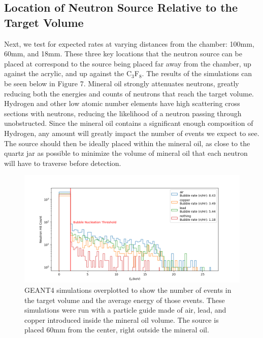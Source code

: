 \documentclass[%
12pt,
twoside,
reprint,
amsmath,amssymb,
aps,
]{article}
\begin{document}
	\subsection{Location of Neutron Source Relative to the Target Volume}
	\par Next, we test for expected rates at varying distances from the chamber: 100mm, 60mm, and 18mm. These three key locations that the neutron source can be placed at correspond to the source being placed far away from the chamber, up against the acrylic, and up against the C$_{3}$F$_{8}$. The results of the simulations can be seen below in Figure 7. Mineral oil strongly attenuates neutrons, greatly reducing both the energies and counts of neutrons that reach the target volume. Hydrogen and other low atomic number elements have high scattering cross sections with neutrons, reducing the likelihood of a neutron passing through unobstructed. Since the mineral oil contains a significant enough composition of Hydrogen, any amount will greatly impact the number of events we expect to see. The source should then be ideally placed within the mineral oil, as close to the quartz jar as possible to minimize the volume of mineral oil that each neutron will have to traverse before detection.
	
	\begin{figure}[!b]
		\includegraphics[scale = 0.6, center]{Images/particle_guide_log.png}
		\caption{\label{tab:table-name} GEANT4 simulations overplotted to show the number of events in the target volume and the average energy of those events. These simulations were run with a particle guide made of air, lead, and copper introduced inside the mineral oil volume. The source is placed 60mm from the center, right outside the mineral oil.}
	\end{figure}
	
\end{document}
